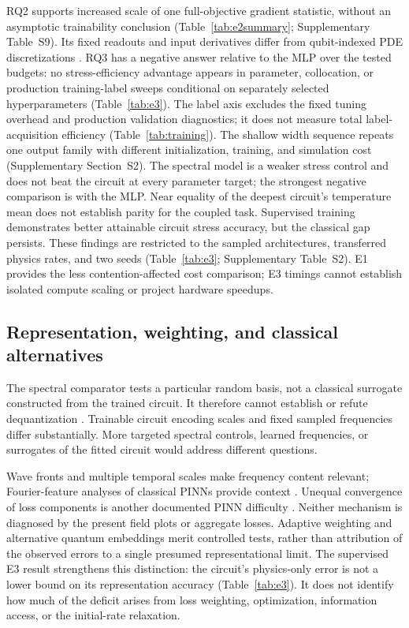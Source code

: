 \documentclass[11pt]{article}
\begin{document}
RQ2 supports increased scale of one full-objective gradient statistic,
without an asymptotic trainability conclusion
(Table~\ref{tab:e2summary}; Supplementary Table~S9). Its fixed readouts and input derivatives
differ from qubit-indexed PDE discretizations \citep{Ukwatta2026}.
RQ3 has a negative answer relative to the MLP over the tested budgets:
no stress-efficiency advantage appears in parameter, collocation, or
production training-label sweeps conditional on separately selected
hyperparameters (Table~\ref{tab:e3}). The label axis excludes the fixed
tuning overhead and production validation diagnostics; it does not measure
total label-acquisition efficiency (Table~\ref{tab:training}). The shallow
width sequence repeats one output family with different initialization,
training, and simulation cost (Supplementary Section~S2).
The spectral model is a weaker stress control
and does not beat the circuit at every parameter target; the strongest
negative comparison is with the MLP. Near equality of the deepest
circuit's temperature mean does not establish parity for the coupled
task. Supervised training demonstrates better attainable circuit stress
accuracy, but the classical gap persists. These findings are restricted
to the sampled architectures, transferred physics rates, and two seeds
(Table~\ref{tab:e3}; Supplementary Table~S2). E1 provides the less
contention-affected cost comparison; E3 timings cannot establish isolated
compute scaling or project hardware speedups.

\subsection{Representation, weighting, and classical alternatives}

The spectral comparator tests a particular random basis, not a classical
surrogate constructed from the trained circuit. It therefore cannot
establish or refute dequantization \citep{Schreiber2023,Sahebi2025}.
Trainable circuit encoding scales and fixed sampled frequencies differ
substantially. More targeted spectral controls, learned frequencies, or
surrogates of the fitted circuit would address different questions.

Wave fronts and multiple temporal scales make frequency content relevant;
Fourier-feature analyses of classical PINNs provide context
\citep{WangFourier2021}. Unequal convergence of loss components is another
documented PINN difficulty \citep{WangNTK2022}. Neither mechanism is
diagnosed by the present field plots or aggregate losses. Adaptive
weighting \citep{Setty2025} and alternative quantum embeddings
\citep{TranEmbedding2026} merit controlled tests, rather than attribution
of the observed errors to a single presumed representational limit.
The supervised E3 result strengthens this distinction: the circuit's
physics-only error is not a lower bound on its representation accuracy
(Table~\ref{tab:e3}). It does not identify how much of the deficit arises
from loss weighting, optimization, information access, or the initial-rate
relaxation.
\end{document}
